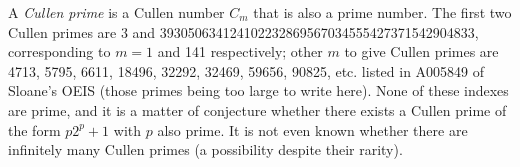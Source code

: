 \documentclass[12pt]{article}
\begin{document}
A {\em Cullen prime} is a Cullen number $C_m$ that is also a prime number. The first two Cullen primes are 3 and 393050634124102232869567034555427371542904833, corresponding to $m = 1$ and 141 respectively; other $m$ to give Cullen primes are 4713, 5795, 6611, 18496, 32292, 32469, 59656, 90825, etc. listed in A005849 of Sloane's OEIS (those primes being too large to write here). None of these indexes are prime, and it is a matter of conjecture whether there exists a Cullen prime of the form $p2^p + 1$ with $p$ also prime. It is not even known whether there are infinitely many Cullen primes (a possibility despite their rarity).
\end{document}
